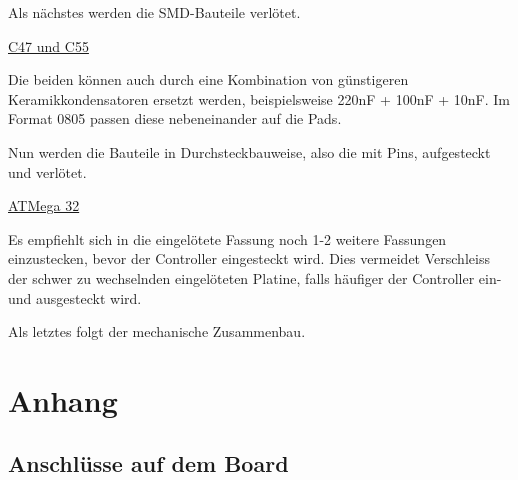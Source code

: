 \documentclass[a4paper]{article}
\begin{document}
{\large Als nächstes werden die SMD-Bauteile verlötet.}

\underline{C47 und C55}

Die beiden können auch durch eine Kombination von günstigeren Keramikkondensatoren ersetzt werden, beispielsweise 220nF + 100nF + 10nF. Im Format 0805 passen diese nebeneinander auf die Pads.

{\large Nun werden die Bauteile in Durchsteckbauweise, also die mit Pins, aufgesteckt und verlötet.} 

\underline{ATMega 32}

Es empfiehlt sich in die eingelötete Fassung noch 1-2 weitere Fassungen einzustecken, bevor der Controller eingesteckt wird. Dies vermeidet Verschleiss der schwer zu wechselnden eingelöteten Platine, falls häufiger der Controller ein- und ausgesteckt wird.

{\large Als letztes folgt der mechanische Zusammenbau.}

\section{Anhang}

\subsection{Anschlüsse auf dem Board}
\end{document}
